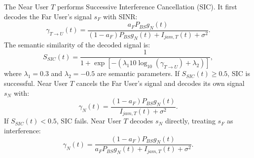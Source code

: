 \documentclass[journal,onecolumn]{IEEEtran}
\begin{document}
The Near User $T$ performs Successive Interference Cancellation (SIC). It first decodes the Far User's signal $s_F$ with SINR:
\begin{equation}
    \gamma_{T \to U}(t) = \frac{a_F P_{BS} g_N(t)}{(1 - a_F) P_{BS} g_N(t) + I_{jam, T}(t) + \sigma^2}.
\end{equation}
The semantic similarity of the decoded signal is:
\begin{equation}
    S_{SIC}(t) = \frac{1}{1 + \exp\left[ -\left( \lambda_1 10\log_{10}(\gamma_{T \to U}) + \lambda_2 \right) \right]},
\end{equation}
where $\lambda_1 = 0.3$ and $\lambda_2 = -0.5$ are semantic parameters. If $S_{SIC}(t) \ge 0.5$, SIC is successful. Near User $T$ cancels the Far User's signal and decodes its own signal $s_N$ with:
\begin{equation}
    \gamma_N(t) = \frac{(1 - a_F) P_{BS} g_N(t)}{I_{jam, T}(t) + \sigma^2}.
\end{equation}
If $S_{SIC}(t) < 0.5$, SIC fails. Near User $T$ decodes $s_N$ directly, treating $s_F$ as interference:
\begin{equation}
    \gamma_N(t) = \frac{(1 - a_F) P_{BS} g_N(t)}{a_F P_{BS} g_N(t) + I_{jam, T}(t) + \sigma^2}.
\end{equation}
\end{document}
